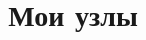 \documentclass[a4paper]{scrartcl}
\begin{document}
\title{Мои узлы}

\newcommand{\drawknot}[3]{
	\immediate\write18{node ../js/draw-knot.js #1 #2 #3}
	\texttt{[image: \#3]}
}


\stealcurrent
\end{document}
